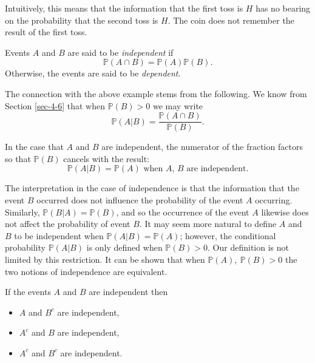Intuitively, this means that the information that the first toss is
\(H\) has no bearing on the probability that the second toss is
\(H\). The coin does not remember the result of the first toss.

\begin{defn}
Events \(A\) and \(B\) are said to be \emph{independent} if 
\begin{equation}
\mathbb{P}(A\cap B)=\mathbb{P}(A)\mathbb{P}(B).
\end{equation}
Otherwise, the events are said to be \emph{dependent}. 
\end{defn}

The connection with the above example stems from the following. We
know from Section \ref{sec-4-6} that when
\(\mathbb{P}(B)>0\) we may write
\begin{equation}
\mathbb{P}(A|B)=\frac{\mathbb{P}(A\cap B)}{\mathbb{P}(B)}.
\end{equation}

In the case that \(A\) and \(B\) are independent, the numerator of the
fraction factors so that \(\mathbb{P}(B)\) cancels with the result:
\begin{equation}
\mathbb{P}(A|B)=\mathbb{P}(A)\mbox{ when \(A\), \(B\) are independent.}
\end{equation}

The interpretation in the case of independence is that the information
that the event \(B\) occurred does not influence the probability of
the event \(A\) occurring. Similarly,
\(\mathbb{P}(B|A)=\mathbb{P}(B)\), and so the occurrence of the event
\(A\) likewise does not affect the probability of event \(B\). It may
seem more natural to define \(A\) and \(B\) to be independent when
\(\mathbb{P}(A|B)=\mathbb{P}(A)\); however, the conditional
probability \(\mathbb{P}(A|B)\) is only defined when
\(\mathbb{P}(B)>0\). Our definition is not limited by this
restriction. It can be shown that when \(\mathbb{P}(A),\
\mathbb{P}(B)>0\) the two notions of independence are equivalent.

\begin{prop}
If the events \(A\) and \(B\) are independent then
\begin{itemize}
\item \(A\) and \(B^{c}\) are independent,
\item \(A^{c}\) and \(B\) are independent,
\item \(A^{c}\) and \(B^{c}\) are independent.
\end{itemize}
\end{prop}

